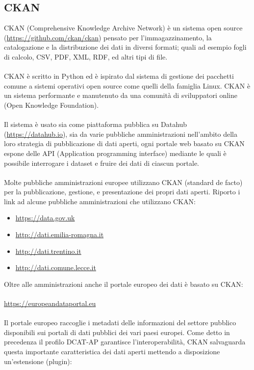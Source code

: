 \documentclass{article}
\theoremstyle{plain}
\theoremstyle{definition}
\begin{document}
\subsection{CKAN}
CKAN (Comprehensive Knowledge Archive Network) è un sistema open source (\url{https://github.com/ckan/ckan}) pensato per l'immagazzinamento, la catalogazione e la distribuzione dei dati in diversi formati; quali ad esempio fogli di calcolo, CSV, PDF, XML, RDF, ed altri tipi di file.
\\
\\
CKAN è scritto in Python ed è ispirato dal sistema di gestione dei pacchetti comune a sistemi operativi open source come quelli della famiglia Linux. CKAN è un sistema performante e manutenuto da una comunità di sviluppatori online (Open Knowledge Foundation).  
\\
\\
Il sistema è usato sia come piattaforma pubblica su Datahub (\url{https://datahub.io}), sia da varie pubbliche amministrazioni nell'ambito della loro strategia di pubblicazione di dati aperti, ogni portale web basato su CKAN espone delle API (Application programming interface) mediante le quali è possibile interrogare i dataset e fruire dei dati di ciascun portale. 
\\
\\
Molte pubbliche amministrazioni europee utilizzano CKAN (standard de facto) per la pubblicazione, gestione, e presentazione dei propri dati aperti. Riporto i link ad alcune pubbliche amministrazioni che utilizzano CKAN:
\begin{itemize}

\item \url{https://data.gov.uk}
\item \url{http://dati.emilia-romagna.it}
\item \url{http://dati.trentino.it}
\item \url{http://dati.comune.lecce.it}
\end{itemize}
Oltre alle amministrazioni anche il portale europeo dei dati è basato su CKAN:
\\
\\
\url{https://europeandataportal.eu}
\\
\\
Il portale europeo raccoglie i metadati delle informazioni del settore pubblico disponibili sui portali di dati pubblici dei vari paesi europei.
Come detto in precedenza il profilo DCAT-AP garantisce l'interoperabilità, CKAN salvaguarda questa importante caratteristica dei dati aperti mettendo a disposizione un'estensione (plugin):
\end{document}
